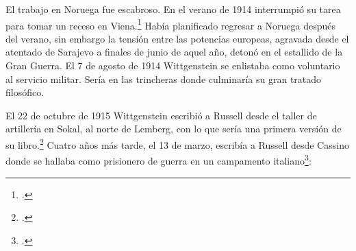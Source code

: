 El trabajo en Noruega fue escabroso. En el verano de 1914 interrumpió su tarea
para tomar un receso en Viena.\footcite[cap. 5 loc 2154]{monk} Había planificado
regresar a Noruega después del verano, sin embargo la tensión entre las
potencias europeas, agravada desde el atentado de Sarajevo a finales de junio de
aquel año, detonó en el estallido de la Gran Guerra. El 7 de agosto de 1914
Wittgenstein se enlistaba como voluntario al servicio militar. Sería en las
trincheras donde culminaría su gran tratado filosófico.

El 22 de octubre de 1915 Wittgenstein escribió a Russell desde el taller de
artillería en Sokal, al norte de Lemberg, con lo que sería una primera versión
de su libro.\footcite[cf. p.84]{cambridgeletters} Cuatro años más tarde, el 13
de marzo, escribía a Russell desde Cassino donde se hallaba como prisionero de
guerra en un campamento italiano\footcite[cf. p.268]{mcguinness}: 

